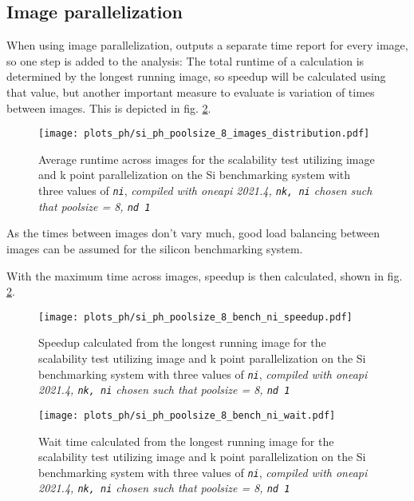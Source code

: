 \documentclass[main.tex]{subfiles}
\begin{document}
\subsection{Image parallelization}\label{sub:scaling_ph_images}

When using image parallelization, \QE outputs a separate time report for every image, so one step is added to the analysis:
The total runtime of a calculation is determined by the longest running image, so speedup will be calculated using that value, but another important measure to evaluate is variation of times between images.
This is depicted in fig. \ref{fig:scaling_ph_ni_poolsize_8_si}.

\begin{figure}[ht!]
    \centering
    \texttt{[image: plots\_ph/si\_ph\_poolsize\_8\_images\_distribution.pdf]}
    \caption{Average runtime across images for the scalability test utilizing image and k point parallelization on the Si benchmarking system with three values of \emph{\texttt{ni}}, \emph{\QE compiled with \gls{oneapi} 2021.4, \texttt{nk, ni} chosen such that poolsize = 8, \texttt{nd 1}}}
    \label{fig:scaling_ph_ni_poolsize_8_si_distribution}
\end{figure}
As the times between images don't vary much, good load balancing between images can be assumed for the silicon benchmarking system.

With the maximum time across images, speedup is then calculated, shown in fig. \ref{fig:scaling_ph_ni_poolsize_8_si}.

\begin{figure}[ht!]
    \centering
    \texttt{[image: plots\_ph/si\_ph\_poolsize\_8\_bench\_ni\_speedup.pdf]}
    \caption{Speedup calculated from the longest running image for the scalability test utilizing image and k point parallelization on the Si benchmarking system with three values of \emph{\texttt{ni}}, \emph{\QE compiled with \gls{oneapi} 2021.4, \texttt{nk, ni} chosen such that poolsize = 8, \texttt{nd 1}}}
    \label{fig:scaling_ph_ni_poolsize_8_si}
\end{figure}


\begin{figure}[ht!]
    \centering
    \texttt{[image: plots\_ph/si\_ph\_poolsize\_8\_bench\_ni\_wait.pdf]}
    \caption{Wait time calculated from the longest running image for the scalability test utilizing image and k point parallelization on the Si benchmarking system with three values of \emph{\texttt{ni}}, \emph{\QE compiled with \gls{oneapi} 2021.4, \texttt{nk, ni} chosen such that poolsize = 8, \texttt{nd 1}}}
    \label{fig:scaling_ph_ni_poolsize_8_si_wait}
\end{figure}
\end{document}
